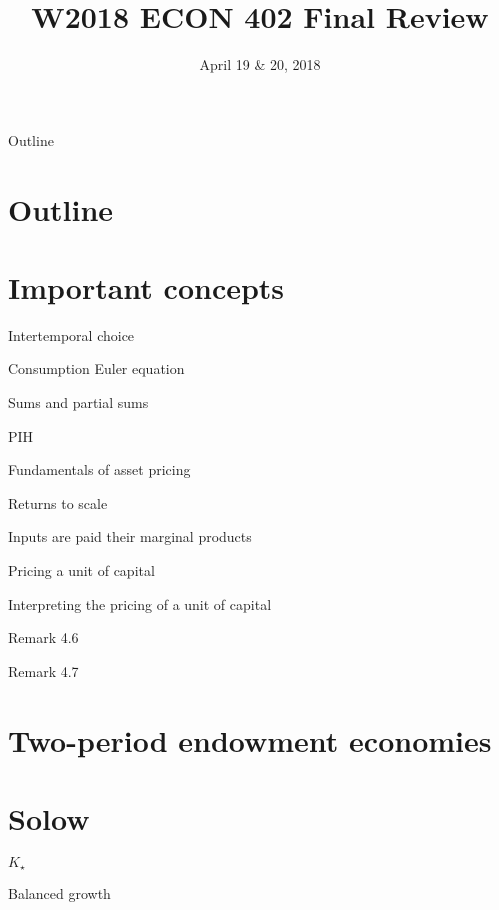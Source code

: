 \documentclass[presentation,dvipsnames]{beamer}
\author{}
\date{April 19 \& 20, 2018}
\title{W2018 ECON 402 Final Review}
\begin{document}
\maketitle
\begin{frame}{Outline}
\setcounter{tocdepth}{1}
\tableofcontents
\end{frame}

\section{Outline}
\label{sec-1}
\section{Important concepts}
\label{sec-2}
\begin{frame}[label=sec-2-1]{Intertemporal choice}
\end{frame}
\begin{frame}[label=sec-2-2]{Consumption Euler equation}
\end{frame}
\begin{frame}[label=sec-2-3]{Sums and partial sums}
\end{frame}
\begin{frame}[label=sec-2-4]{PIH}
\end{frame}
\begin{frame}[label=sec-2-5]{Fundamentals of asset pricing}
\end{frame}
\begin{frame}[label=sec-2-6]{Returns to scale}
\end{frame}
\begin{frame}[label=sec-2-7]{Inputs are paid their marginal products}
\end{frame}
\begin{frame}[label=sec-2-8]{Pricing a unit of capital}
\end{frame}
\begin{frame}[label=sec-2-9]{Interpreting the pricing of a unit of capital}
\begin{block}{Remark 4.6}
\end{block}
\begin{block}{Remark 4.7}
\end{block}
\end{frame}
\section{Two-period endowment economies}
\label{sec-3}
\section{Solow}
\label{sec-4}
\begin{frame}[label=sec-4-1]{$K_{\star}$}
\end{frame}
\begin{frame}[label=sec-4-2]{Balanced growth}
\end{frame}
\end{document}
